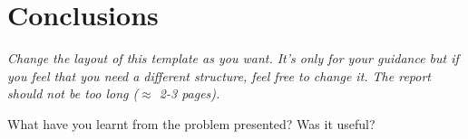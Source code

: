\documentclass[a4paper, 11pt]{article}
\begin{document}
\section{Conclusions}

\textit{Change the layout of this template as you want. It's only for
  your guidance but if you feel that you need a different structure,
  feel free to change it. The report should not be too long ($\approx$
  2-3 pages).}

What have you learnt from the problem presented?
Was it useful?
\end{document}
